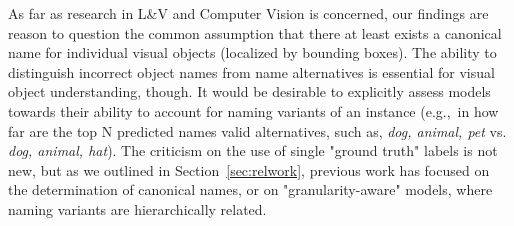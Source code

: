 As far as research in L\&V and Computer Vision is concerned, our findings are reason to question 
 the common assumption that there at least exists a canonical name
 for individual visual objects (localized by bounding boxes).
%
The ability to distinguish incorrect object names from name alternatives is essential for visual object understanding, though. 
It would be desirable to explicitly assess models towards their ability to account for naming variants of an instance (e.g.,~in how far are the top N predicted names valid alternatives, such as, \textsl{dog, animal, pet} vs. \textsl{dog, animal, hat}). 
%
The criticism on the use of single "ground truth" labels is not new, but %
as we outlined in Section\ \ref{sec:relwork}, previous work has focused on the determination of canonical names, or on "granularity-aware" models, where naming variants are hierarchically related. 
%
